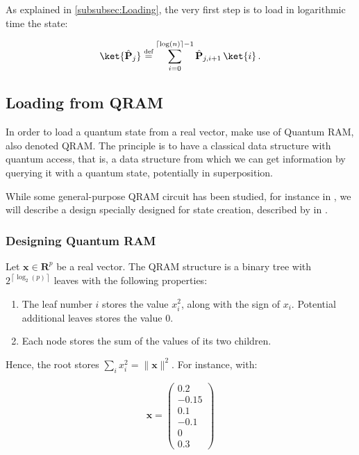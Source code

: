 \documentclass[11pt, a4paper]{article}
\begin{document}
        As explained in \autoref{subsubsec:Loading}, the very first step is to load in logarithmic time the state:
        
        \[\ket{\hat{\mathbf{P}}_j} \overset{\text{\tiny{def}}}{=} \sum_{i=0}^{\lceil\log(n)\rceil-1}\hat{\mathbf{P}}_{j,i + 1}\,\ket{i}\,.\]
        
        \subsection{Loading from QRAM}
            \label{subsec:LoadingQRAM}
            In order to load a quantum state from a real vector, \citeauthor{QRS} make use of Quantum RAM, also denoted QRAM. The principle is to have a classical data structure with quantum access, that is, a data structure from which we can get information by querying it with a quantum state, potentially in superposition.
            
            While some general-purpose QRAM circuit has been studied, for instance in \cite{QRAMCircuit}, we will describe a design specially designed for state creation, described by \citeauthor{Prakash} in \cite{Prakash}.
            
            \subsubsection{Designing Quantum RAM}
                \label{subsubsec:QRAM}
                Let \(\mathbf{x}\in\mathbf{R}^p\) be a real vector. The QRAM structure is a binary tree with \(2^{\left\lceil\log_2(p)\right\rceil}\) leaves with the following properties:
                
                \begin{enumerate}
                    \item The leaf number \(i\) stores the value \(x_i^2\), along with the sign of \(x_i\). Potential additional leaves stores the value \(0\). 
                    \item Each node stores the sum of the values of its two children.
                \end{enumerate}
                
                Hence, the root stores \(\sum_ix_i^2=\|\mathbf{x}\|^2\). For instance, with:
                
                \[\mathbf{x}=\begin{pmatrix}0.2\\-0.15\\0.1\\ -0.1\\0\\0.3\end{pmatrix}\]
                
\end{document}
